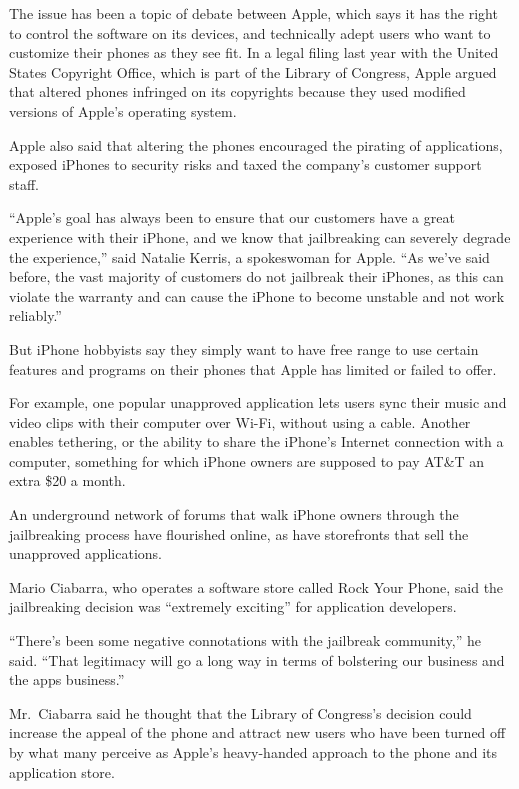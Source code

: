 ﻿\documentclass[12pt]{article}
\begin{document}
The issue has been a topic of debate between Apple, which says it has the right to control the
software on its devices, and technically adept users who want to customize their phones as they see
fit. In a legal filing last year with the United States Copyright Office, which is part of the
Library of Congress, Apple argued that altered phones infringed on its copyrights because they used
modified versions of Apple's operating system.

Apple also said that altering the phones encouraged the pirating of applications, exposed iPhones to
security risks and taxed the company's customer support staff.

``Apple's goal has always been to ensure that our customers have a great experience with their
iPhone, and we know that jailbreaking can severely degrade the experience,'' said Natalie Kerris, a
spokeswoman for Apple. ``As we've said before, the vast majority of customers do not jailbreak their
iPhones, as this can violate the warranty and can cause the iPhone to become unstable and not work
reliably.''

But iPhone hobbyists say they simply want to have free range to use certain features and programs on
their phones that Apple has limited or failed to offer.

For example, one popular unapproved application lets users sync their music and video clips with
their computer over Wi-Fi, without using a cable. Another enables tethering, or the ability to share
the iPhone's Internet connection with a computer, something for which iPhone owners are supposed to
pay AT\&T an extra \$20 a month.

An underground network of forums that walk iPhone owners through the jailbreaking process have
flourished online, as have storefronts that sell the unapproved applications.

Mario Ciabarra, who operates a software store called Rock Your Phone, said the jailbreaking decision
was ``extremely exciting'' for application developers.

``There's been some negative connotations with the jailbreak community,'' he said. ``That legitimacy
will go a long way in terms of bolstering our business and the apps business.''

Mr.~Ciabarra said he thought that the Library of Congress's decision could increase the appeal of
the phone and attract new users who have been turned off by what many perceive as Apple's
heavy-handed approach to the phone and its application store.
\end{document}
